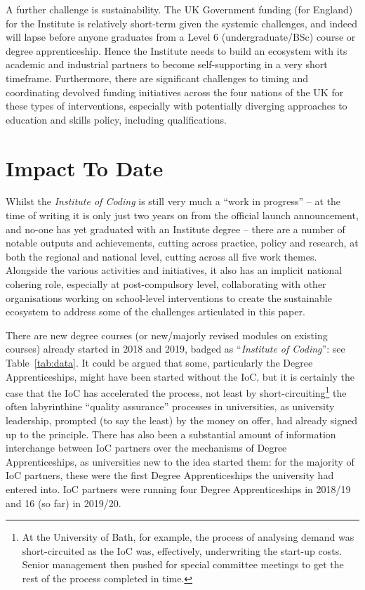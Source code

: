 \documentclass[conference]{IEEEtran}
\begin{document}
A further challenge is sustainability. The UK Government funding (for
England) for the Institute is relatively short-term given the systemic
challenges, and indeed will lapse before anyone graduates from a Level
6 (undergraduate/BSc) course or degree apprenticeship. Hence the
Institute needs to build an ecosystem with its academic and industrial
partners to become self-supporting in a very short
timeframe. Furthermore, there are significant challenges to timing and
coordinating devolved funding initiatives across the four nations of
the UK for these types of interventions, especially with potentially
diverging approaches to education and skills policy, including
qualifications.

\section{Impact To Date}\label{impact}

Whilst the {\emph{Institute of Coding}} is still very much a ``work in
progress'' -- at the time of writing it is only just two years on from
the official launch announcement, and no-one has yet graduated with an
Institute degree -- there are a number of notable outputs and
achievements, cutting across practice, policy and research, at both
the regional and national level, cutting across all five work
themes. Alongside the various activities and initiatives, it also has
an implicit national cohering role, especially at post-compulsory
level, collaborating with other organisations working on school-level
interventions to create the sustainable ecosystem to address some of
the challenges articulated in this paper.

There are new degree courses (or new/majorly revised modules on
existing courses) already started in 2018 and 2019, badged as
``{\emph{Institute of Coding}}'': see Table~\ref{tab:data}.  It could be argued
that some, particularly the Degree Apprenticeships, might have been
started without the IoC, but it is certainly the case
that the IoC has accelerated the process, not least by
short-circuiting\footnote{At the University of Bath, for example, the process of
analysing demand was short-circuited as the IoC was, effectively,
underwriting the start-up costs. Senior management then pushed for
special committee meetings to get the rest of the process completed in
time.} the often labyrinthine ``quality assurance'' processes in
universities, as university leadership, prompted (to say the least) by
the money on offer, had already signed up to the principle. There has
also been a substantial amount of information interchange between IoC
partners over the mechanisms of Degree Apprenticeships, as
universities new to the idea started them: for the majority of IoC
partners, these were the first Degree Apprenticeships the university
had entered into. IoC partners were running four Degree Apprenticeships
in 2018/19 and 16 (so far) in 2019/20.
\end{document}
